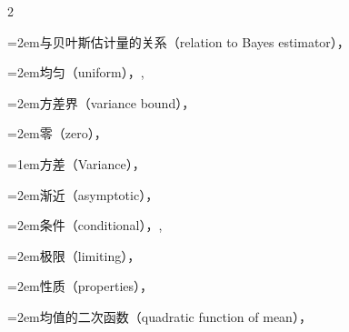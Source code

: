 \begin{multicols}{2}
\par\noindent\hangindent=2em\hspace*{1em}\label{idx:1058}与贝叶斯估计量的关系（relation to Bayes estimator），\hyperref[sec:7.5.2]{\pageref*{sec:7.5.2}}\par
\par\noindent\hangindent=2em\hspace*{1em}\label{idx:1059}均匀（uniform），\hyperref[ex:7.3.13]{\pageref*{ex:7.3.13}}, \hyperref[ex:7.3.21]{\pageref*{ex:7.3.21}}\par
\par\noindent\hangindent=2em\hspace*{1em}\label{idx:1060}方差界（variance bound），\hyperref[ex:7.3.14]{\pageref*{ex:7.3.14}}\par
\par\noindent\hangindent=2em\hspace*{1em}\label{idx:1061}零（zero），\hyperref[ex:7.3.21]{\pageref*{ex:7.3.21}}\par
\par\addvspace{2pt}
\par\noindent\hangindent=1em\hspace*{0em}\label{idx:1062}方差（Variance），\hyperref[def:2.3.2]{\pageref*{def:2.3.2}}\par
\par\noindent\hangindent=2em\hspace*{1em}\label{idx:1063}渐近（asymptotic），\hyperref[idxocc:1063:410]{\pageref*{idxocc:1063:410}}\par
\par\noindent\hangindent=2em\hspace*{1em}\label{idx:1064}条件（conditional），\hyperref[idxocc:1064:155]{\pageref*{idxocc:1064:155}}, \hyperref[thm:4.4.7]{\pageref*{thm:4.4.7}}\par
\par\noindent\hangindent=2em\hspace*{1em}\label{idx:1065}极限（limiting），\hyperref[def:10.1.7]{\pageref*{def:10.1.7}}\par
\par\noindent\hangindent=2em\hspace*{1em}\label{idx:1066}性质（properties），\hyperref[thm:2.3.4]{\pageref*{thm:2.3.4}}\par
\par\noindent\hangindent=2em\hspace*{1em}\label{idx:1067}均值的二次函数（quadratic function of mean），\hyperref[idxocc:1067:110]{\pageref*{idxocc:1067:110}}\par

\end{multicols}
